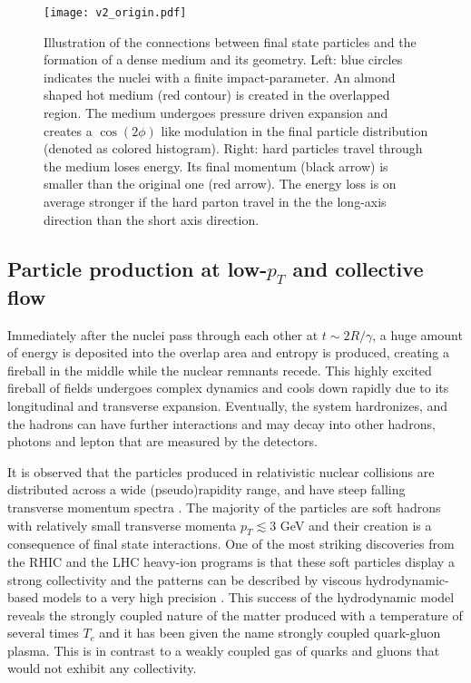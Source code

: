 \begin{figure}
\centering
\texttt{[image: v2\_origin.pdf]}
\caption{Illustration of the connections between final state particles and the formation of a dense medium and its geometry. Left: blue circles indicates the nuclei with a finite impact-parameter. An almond shaped hot medium (red contour) is created in the overlapped region. The medium undergoes pressure driven expansion and creates a $\cos(2\phi)$ like modulation in the final particle distribution (denoted as colored histogram). Right: hard particles travel through the medium loses energy. Its final momentum (black arrow) is smaller than the original one (red arrow). The energy loss is on average stronger if the hard parton travel in the the long-axis direction than the short axis direction.}
\end{figure}


\subsection{Particle production at low-$p_T$ and collective flow} 
Immediately after the nuclei pass through each other at $t\sim 2R/\gamma$, a huge amount of energy is deposited into the overlap area and entropy is produced, creating a fireball in the middle while the nuclear remnants recede.
This highly excited fireball of fields undergoes complex dynamics and cools down rapidly due to its longitudinal and transverse expansion.
Eventually, the system hardronizes, and the hadrons can have further interactions and may decay into other hadrons, photons and lepton that are measured by the detectors.

It is observed that the particles produced in relativistic nuclear collisions are distributed across a wide (pseudo)rapidity range, and have steep falling transverse momentum spectra \cite{ALICE:2015kda}.
The majority of the particles are soft hadrons with relatively small transverse momenta $p_T \lesssim 3$ GeV and their creation is a consequence of final state interactions.
One of the most striking discoveries from the RHIC and the LHC heavy-ion programs is that these soft particles display a strong collectivity and the patterns can be described by viscous hydrodynamic-based models to a very high precision \cite{Dusling:2007gi,Song:2008si,Schenke:2010nt,Petersen:2008dd,Niemi:2015qia,Bernhard:2016tnd,Bernhard:2018hnz}.
This success of the hydrodynamic model reveals the strongly coupled nature of the matter produced with a temperature of several times $T_c$ and it has been given the name strongly coupled quark-gluon plasma.
This is in contrast to a weakly coupled gas of quarks and gluons that would not exhibit any collectivity.

